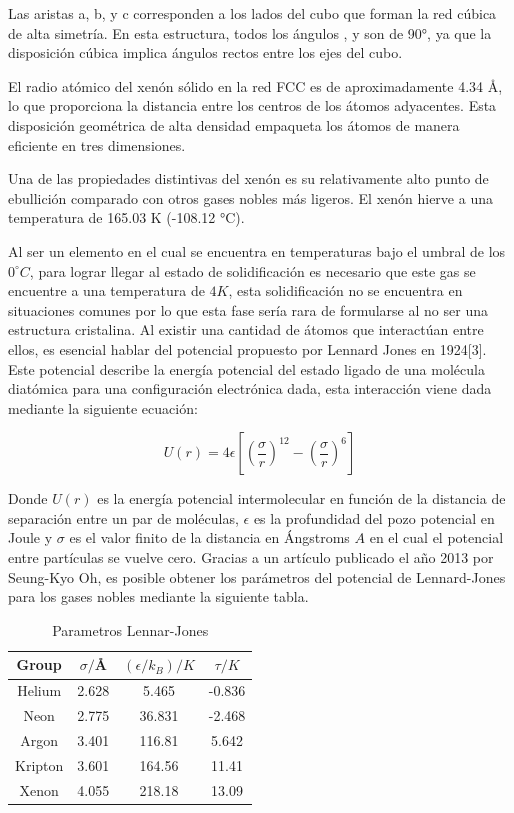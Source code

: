 \documentclass[10pt,letterpaper,twocolumn]{article}
\begin{document}
Las aristas a, b, y c corresponden a los lados del cubo que forman la red cúbica de alta simetría. 
En esta estructura, todos los ángulos \si{\alpha}, \si{\beta} y \si{\gamma} son de 90°, ya que la 
disposición cúbica implica ángulos rectos entre los ejes del cubo.

El radio atómico del xenón sólido en la red FCC es de aproximadamente 4.34 Å, lo que proporciona la 
distancia entre los centros de los átomos adyacentes. Esta disposición geométrica de alta densidad 
empaqueta los átomos de manera eficiente en tres dimensiones.

Una de las propiedades distintivas del xenón es su relativamente alto punto de ebullición comparado 
con otros gases nobles más ligeros. El xenón hierve a una temperatura de 165.03 K (-108.12 °C).

Al ser un elemento en el cual se encuentra en temperaturas bajo el umbral de los $0^{\circ}C$, para 
lograr llegar al estado de solidificación es necesario que este gas se encuentre a una temperatura 
de $4K$, esta solidificación no se encuentra en situaciones comunes por lo
que esta fase sería rara de formularse al no ser una estructura cristalina.
Al existir una cantidad de átomos que interactúan entre ellos, es esencial hablar del potencial 
propuesto por Lennard Jones en 1924[3]. Este potencial describe la energía potencial del estado 
ligado de una molécula diatómica para una configuración electrónica dada, esta interacción viene 
dada mediante la siguiente ecuación:

\begin{equation}
    U(r)=4\epsilon\left[\left(\dfrac{\sigma}{r}\right)^{12} - \left(\dfrac{\sigma}{r}\right)^{6}\right]
\end{equation} 

Donde $U(r)$ es la energía potencial intermolecular en función de la distancia de 
separación entre un par de moléculas, $\epsilon$ es la profundidad del pozo potencial 
en Joule y $\sigma$ es el valor finito de la distancia en Ángstroms $A$ en el cual el 
potencial entre partículas se vuelve cero.
Gracias a un artículo publicado el año 2013 por Seung-Kyo Oh, es posible
obtener los parámetros del potencial de Lennard-Jones para los gases nobles
mediante la siguiente tabla.

\begin{table}[h] %
\centering %
\begin{tabular}{cccc}
\toprule
Group & $\sigma /$\AA & $(\epsilon/k_{B})/K$ & $\tau/K$ \\
\midrule 
Helium  & 2.628 & 5.465 & -0.836 \\
Neon  & 2.775 & 36.831 & -2.468\\ 
Argon  & 3.401 & 116.81 & 5.642\\
Kripton  & 3.601 & 164.56 & 11.41\\
Xenon & 4.055 & 218.18 & 13.09\\

\bottomrule
\end{tabular}
\caption{Parametros Lennar-Jones}
\label{tab:periodos_oscilacion}
\end{table}
\end{document}
